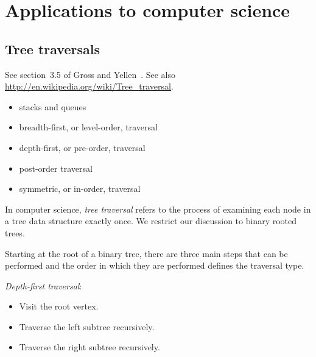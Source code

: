 
\section{Applications to computer science}



\subsection{Tree traversals}

See section~3.5 of Gross and Yellen~\cite{GrossYellen1999}.
See also \url{http://en.wikipedia.org/wiki/Tree_traversal}.

\begin{itemize}
\item stacks and queues

\item breadth-first, or level-order, traversal

\item depth-first, or pre-order, traversal

\item post-order traversal

\item symmetric, or in-order, traversal
\end{itemize}

In computer science, {\it tree traversal} refers to the process of
examining each node in a tree data structure exactly once.
We restrict our discussion to binary rooted trees.

Starting at the root of a binary tree, there are three main steps that
can be performed and the order in which they are performed defines the
traversal type.

\noindent
{\it Depth-first traversal}:
\begin{itemize}
\item
Visit the root vertex.

\item
Traverse the left subtree recursively.

\item
Traverse the right subtree recursively.

\end{itemize}


